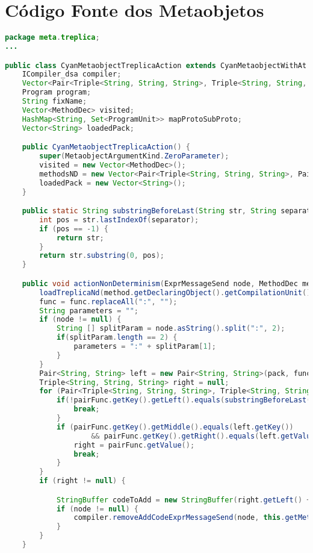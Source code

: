 \chapter{Código Fonte dos Metaobjetos}\label{apd:metaobjetos}

\begin{lstlisting}[basicstyle=\tiny, language=Java, caption={Código Fonte de \textbf{CyanMetaobjectTreplicaAction}}, label={cod:MetaActionFonte}]
package meta.treplica;
...

public class CyanMetaobjectTreplicaAction extends CyanMetaobjectWithAt implements IActionProgramUnit_ati, IAction_dsa {
	ICompiler_dsa compiler;
	Vector<Pair<Triple<String, String, String>, Triple<String, String, String>>> methodsND;
    Program program;
    String fixName;
	Vector<MethodDec> visited;
	HashMap<String, Set<ProgramUnit>> mapProtoSubProto;
	Vector<String> loadedPack;

	public CyanMetaobjectTreplicaAction() {
		super(MetaobjectArgumentKind.ZeroParameter);
		visited = new Vector<MethodDec>();
		methodsND = new Vector<Pair<Triple<String, String, String>, Pair<String, String>>>();
		loadedPack = new Vector<String>();
	}

    public static String substringBeforeLast(String str, String separator) {
       	int pos = str.lastIndexOf(separator);
       	if (pos == -1) {
       		return str;
       	}
       	return str.substring(0, pos);
   	}

	public void actionNonDeterminism(ExprMessageSend node, MethodDec method, String pack, String func) {
        loadTreplicaNd(method.getDeclaringObject().getCompilationUnit().getPackageName());
		func = func.replaceAll(":", "");
		String parameters = "";
		if (node != null) {
			String [] splitParam = node.asString().split(":", 2);
			if(splitParam.length == 2) {
				parameters = ":" + splitParam[1];
			}
		}
		Pair<String, String> left = new Pair<String, String>(pack, func);
		Triple<String, String, String> right = null;
		for (Pair<Triple<String, String, String>, Triple<String, String, String>> pairFunc : methodsND) {
			if(!pairFunc.getKey().getLeft().equals(substringBeforeLast(method.getDeclaringObject().getFullName(), ".")) ) {
				break;
			}
			if (pairFunc.getKey().getMiddle().equals(left.getKey())
					&& pairFunc.getKey().getRight().equals(left.getValue())) {
				right = pairFunc.getValue();
				break;
			}
		}
		if (right != null) {

			StringBuffer codeToAdd = new StringBuffer(right.getLeft() + "." + right.getMiddle() + " " + right.getRight().trim() + parameters );
			if (node != null) {
				compiler.removeAddCodeExprMessageSend(node, this.getMetaobjectAnnotation(), codeToAdd, node.getType());
			}
		}
	}


\end{lstlisting}

